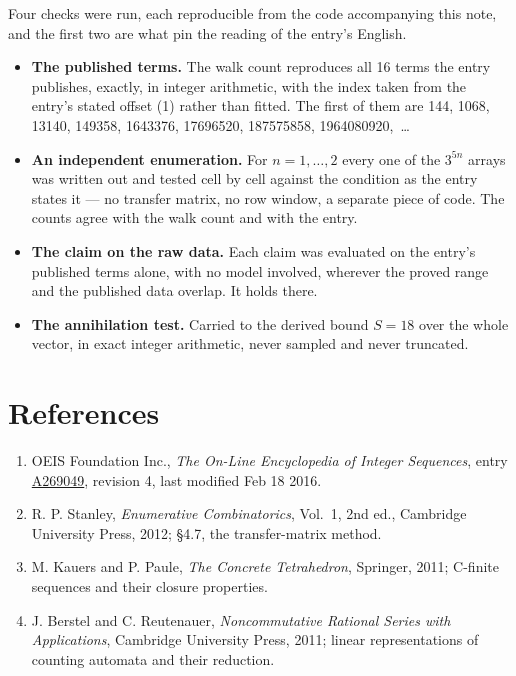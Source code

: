\documentclass[11pt]{article}
\theoremstyle{definition}
\begin{document}
Four checks were run, each reproducible from the code accompanying this note, and the first two are what pin the reading of the entry's English.

\begin{itemize}

\item {\bfseries The published terms.} The walk count reproduces all 16 terms the entry publishes, exactly, in integer arithmetic, with the index taken from the entry's stated offset (1) rather than fitted. The first of them are 144, 1068, 13140, 149358, 1643376, 17696520, 187575858, 1964080920,~\dots

\item {\bfseries An independent enumeration.} For $n = 1,\dots,2$ every one of the $3^{5n}$ arrays was written out and tested cell by cell against the condition as the entry states it --- no transfer matrix, no row window, a separate piece of code. The counts agree with the walk count and with the entry.

\item {\bfseries The claim on the raw data.} Each claim was evaluated on the entry's published terms alone, with no model involved, wherever the proved range and the published data overlap. It holds there.

\item {\bfseries The annihilation test.} Carried to the derived bound $S = 18$ over the whole vector, in exact integer arithmetic, never sampled and never truncated.

\end{itemize}

\section{References}

\begin{enumerate}

\item OEIS Foundation Inc., \emph{The On-Line Encyclopedia of Integer Sequences}, entry \href{https://oeis.org/A269049}{A269049}, revision 4, last modified Feb 18 2016.

\item R. P. Stanley, \emph{Enumerative Combinatorics}, Vol.~1, 2nd ed., Cambridge University Press, 2012; \S4.7, the transfer-matrix method.

\item M. Kauers and P. Paule, \emph{The Concrete Tetrahedron}, Springer, 2011; C-finite sequences and their closure properties.

\item J. Berstel and C. Reutenauer, \emph{Noncommutative Rational Series with Applications}, Cambridge University Press, 2011; linear representations of counting automata and their reduction.

\end{enumerate}
\end{document}
